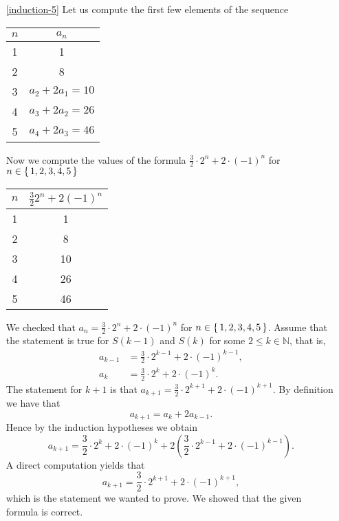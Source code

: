 \begin{enumerate}
\item[\ref{induction-5}] Let us compute the first few elements of the sequence
\begin{center}
\begin{tabular}{|c|c|}
\hline
$n$ & $a_n$\\
\hline
1 & 1\\
\hline
2 & 8\\
\hline
3 & $a_2+2a_1=10$\\
\hline
4 & $a_3+2a_2=26$\\
\hline
5 & $a_4+2a_3=46$\\
\hline
\end{tabular}
\end{center}
Now we compute the values of the formula $\frac{3}{2}\cdot 2^n+2\cdot (-1)^n$ for $n\in\left\{\,1,2,3,4,5\,\right\}$
\begin{center}
\begin{tabular}{|c|c|}
\hline
$n$ & $\frac{3}{2}2^n+2(-1)^n$\\
\hline
1 & 1\\
\hline
2 & 8\\
\hline
3 & 10\\
\hline
4 & 26\\
\hline
5 & 46\\
\hline
\end{tabular}
\end{center}
We checked that $a_n=\frac{3}{2}\cdot 2^n+2\cdot (-1)^n$ for $n\in\left\{\,1,2,3,4,5\,\right\}$. Assume that the statement is true
for $S(k-1)$ and $S(k)$ for some $2\leq k\in\mathbb{N}$, that is,
\begin{align*}
a_{k-1}&=\frac{3}{2}\cdot 2^{k-1}+2\cdot (-1)^{k-1},\\
a_k&=\frac{3}{2}\cdot 2^k+2\cdot (-1)^k.
\end{align*}
The statement for $k+1$ is that $a_{k+1}=\frac{3}{2}\cdot 2^{k+1}+2\cdot (-1)^{k+1}$. By definition we have that
$$
a_{k+1}=a_{k}+2a_{k-1}.
$$
Hence by the induction hypotheses we obtain
$$
a_{k+1}=\frac{3}{2}\cdot 2^k+2\cdot (-1)^k+2\left(\frac{3}{2}\cdot 2^{k-1}+2\cdot (-1)^{k-1}\right).
$$
A direct computation yields that
$$
a_{k+1}=\frac{3}{2}\cdot 2^{k+1}+2\cdot (-1)^{k+1},
$$
which is the statement we wanted to prove. We showed that the given formula is correct.


\end{enumerate}
